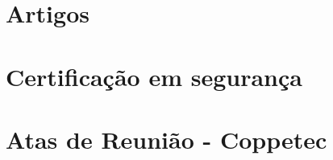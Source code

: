 \documentclass[a4paper,10pt,oneside,brazilian,
draft=false]{report}%
\newcommand*{\standardchapterstyle}{%
  \titleformat{\chapter}[display]
  {\normalfont\huge\bfseries}{\chaptertitlename\ \thechapter}{20pt}{\Huge}
  \titlespacing*{\chapter}{0pt}{50pt}{40pt}
}
\begin{document}
\label{app:artigos}
\chapter{Artigos}



\chapter{Certificação em segurança}


\chapter{Atas de Reunião - Coppetec}







 
 
%
%
%
%
%
%





%

\standardchapterstyle   
\end{document}

